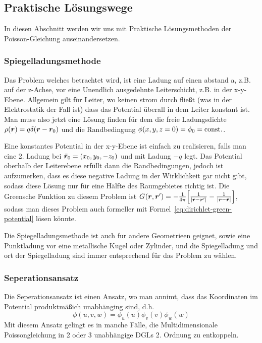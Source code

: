 \subsection{Praktische Lösungswege}%
\label{sub:spiegelladungsmethode}
In diesen Abschnitt werden wir uns mit Praktische Lösungsmethoden der
Poisson-Gleichung auseinandersetzen.

\subsubsection{Spiegelladungsmethode}%
Das Problem welches betrachtet wird, ist eine Ladung auf einen abstand a, z.B.
auf der z-Achse, vor eine Unendlich ausgedehnte Leiterschicht, z.B. in der 
x-y-Ebene. Allgemein gilt für Leiter, wo keinen strom durch fließt (was
in der Elektrostatik der Fall ist) dass das Potential überall in dem Leiter
konstant ist. Man muss also jetzt eine Lösung finden für dem die freie 
Ladungsdichte $\rho(\vb*r)=q\delta(\vb*r-\vb*r_0)$ und die Randbedingung 
$\phi(x,y,z=0)=\phi_0=\mathrm{const.}$. 

Eine konstantes Potential in der x-y-Ebene
ist einfach zu realisieren, falls man eine 2. Ladung bei $\bar{\vb*r}_0=
(x_0,y_0,-z_0)$ und mit Ladung $-q$ legt. Das Potential oberhalb der 
Leiterebene erfüllt dann die Randbedingungen, jedoch ist aufzumerken, dass
es diese negative Ladung in der Wirklichkeit gar nicht gibt, sodass diese 
Lösung nur für eine Hälfte des Raumgebietes richtig ist. Die Greensche
Funktion zu diesem Problem ist $G_{}(\vb*r,\vb*r')=-\frac{1}{4\pi} \qty[\frac{1}{\abs{\vb*r-\vb*r'}}-\frac{1}{\abs{\vb*r-\bar{\vb*r}}}]$, sodass man dieses Problem auch formeller mit 
Formel~\ref{eq:dirichlet-green-potential} lösen könnte.

Die Spiegelladungsmethode ist auch fur andere Geometrieen geignet, sowie
eine Punktladung vor eine metallische Kugel oder Zylinder, und die
Spiegelladung und ort der Spiegelladung sind immer entsprechend für das
Problem zu wählen.

\subsubsection{Seperationsansatz}%
Die Seperationsansatz ist einen Ansatz, wo man annimt, dass das Koordinaten
im Potential produktmäßich unabhänging sind, d.h.
\begin{equation*}
  \phi(u,v,w)=\phi_u(u)\phi_v(v)\phi_w(w)
\end{equation*}
Mit diesem Ansatz gelingt es in manche Fälle, die Multidimensionale 
Poissongleichung in 2 oder 3 unabhängige DGLs 2. Ordnung zu entkoppeln.

